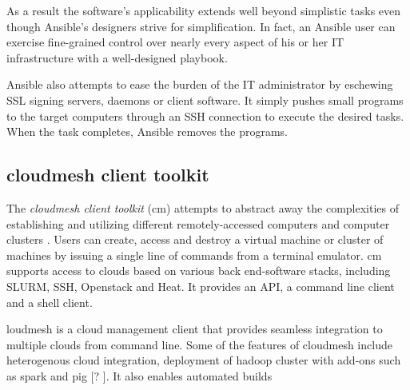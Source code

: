 \documentclass[9pt,twocolumn,twoside]{../../styles/osajnl}
\begin{document}
As a result the software's applicability extends well beyond simplistic tasks even though Ansible's designers strive for simplification.  In fact, an Ansible user can exercise fine-grained control over nearly every aspect of his or her IT infrastructure with a well-designed playbook.  

Ansible also attempts to ease the burden of the IT administrator by eschewing SSL signing servers, daemons or client software.  It simply pushes small programs to the target computers through an SSH connection to execute the desired tasks.  When the task completes, Ansible removes the programs. 

\subsection{cloudmesh client toolkit}
The \textit{cloudmesh client toolkit} (cm) attempts to abstract away the complexities of establishing and utilizing different remotely-accessed computers and computer clusters \cite{www-cm}.  Users can create, access and destroy a virtual machine or cluster of machines by issuing a single line of commands from a terminal emulator.  cm supports access to clouds based on various back end-software stacks, including SLURM, SSH, Openstack and Heat.  It provides an API, a command line client and a shell client.

loudmesh is a cloud management client that provides seamless
integration to multiple clouds from command line. Some of the
features of cloudmesh include heterogenous cloud integration,
deployment of hadoop cluster with add-ons such as spark and
pig [? ]. It also enables automated builds
\end{document}
